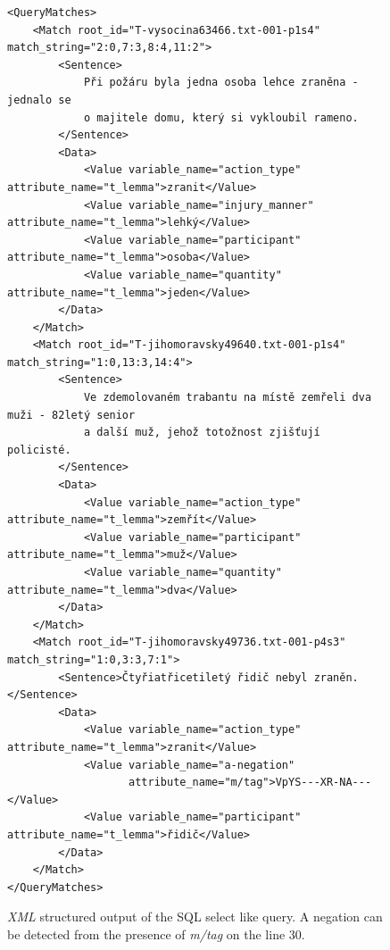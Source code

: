 \begin{figure}
\begin{verbatim}
<QueryMatches>
	<Match root_id="T-vysocina63466.txt-001-p1s4" match_string="2:0,7:3,8:4,11:2">
		<Sentence>
			Při požáru byla jedna osoba lehce zraněna - jednalo se
			o majitele domu, který si vykloubil rameno.
		</Sentence>
		<Data>
			<Value variable_name="action_type" attribute_name="t_lemma">zranit</Value>
			<Value variable_name="injury_manner" attribute_name="t_lemma">lehký</Value>
			<Value variable_name="participant" attribute_name="t_lemma">osoba</Value>
			<Value variable_name="quantity" attribute_name="t_lemma">jeden</Value>
		</Data>
	</Match>
	<Match root_id="T-jihomoravsky49640.txt-001-p1s4" match_string="1:0,13:3,14:4">
		<Sentence>
			Ve zdemolovaném trabantu na místě zemřeli dva muži - 82letý senior
			a další muž, jehož totožnost zjišťují policisté.
		</Sentence>
		<Data>
			<Value variable_name="action_type" attribute_name="t_lemma">zemřít</Value>
			<Value variable_name="participant" attribute_name="t_lemma">muž</Value>
			<Value variable_name="quantity" attribute_name="t_lemma">dva</Value>
		</Data>
	</Match>
	<Match root_id="T-jihomoravsky49736.txt-001-p4s3" match_string="1:0,3:3,7:1">
		<Sentence>Čtyřiatřicetiletý řidič nebyl zraněn.</Sentence>
		<Data>
			<Value variable_name="action_type" attribute_name="t_lemma">zranit</Value>
			<Value variable_name="a-negation" 
			       attribute_name="m/tag">VpYS---XR-NA---</Value>
			<Value variable_name="participant" attribute_name="t_lemma">řidič</Value>
		</Data>
	</Match>
</QueryMatches>
\end{verbatim}
\caption{\emph{XML} structured output of the SQL select like query. A negation can be detected from the presence of \emph{m/tag} on the line 30.}
\label{fig:select_xml}
\end{figure}

